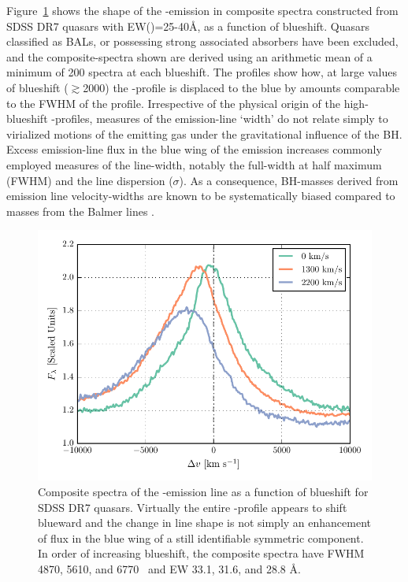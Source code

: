 Figure~\ref{fig:civ_composites} shows the shape of the -emission in composite spectra constructed from SDSS DR7 quasars with EW()=25-40\AA, as a function of  blueshift. 
Quasars classified as BALs, or possessing strong associated absorbers have been excluded, and the composite-spectra shown are derived using an arithmetic mean of a minimum of 200 spectra at each blueshift. 
The profiles show how, at large values of blueshift ($\gtrsim$2000\kms) the -profile is displaced to the blue by amounts comparable to the FWHM of the profile.
Irrespective of the physical origin of the high-blueshift -profiles, measures of the emission-line `width' do not relate simply to virialized motions of the emitting gas under the gravitational influence of the BH. 
Excess emission-line flux in the blue wing of the  emission increases commonly employed measures of the line-width, notably the full-width at half maximum (FWHM) and the line dispersion ($\sigma$). 
As a consequence, BH-masses derived from  emission line velocity-widths are known to be systematically biased compared to masses from the Balmer lines \citep[e.g.][]{shen08,shen12}. 

\begin{figure}
    \centering
    \includegraphics[width=0.9\linewidth]{figures/chapter03/civ_composites.pdf}
    \caption{Composite spectra of the -emission line as a function of  blueshift for SDSS DR7 quasars. Virtually the entire -profile appears to shift blueward and the change in line shape is not simply an enhancement of flux in the blue wing of a still identifiable symmetric component. In order of increasing  blueshift, the composite spectra have FWHM 4870, 5610, and 6770 \kms\, and EW 33.1, 31.6, and 28.8 \AA.}
    \label{fig:civ_composites}
\end{figure}
